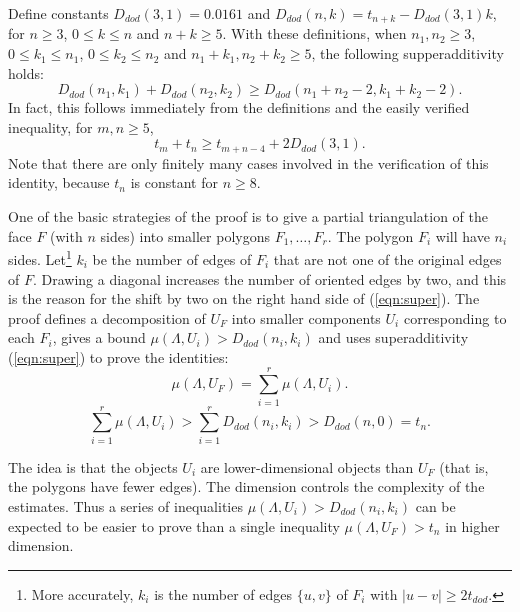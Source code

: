 Define constants $D_{dod}(3,1) = 0.0161$ and $D_{dod}(n,k) = t_{n+k} - D_{dod}(3,1)k$,
for $n\ge 3$, $0\le k\le n$ and $n+k\ge 5$.  With these definitions,
when $n_1,n_2\ge 3$, $0\le k_1\le n_1$, $0\le k_2\le n_2$ and $n_1+k_1,n_2+k_2\ge 5$,  the following supperadditivity holds:
\begin{equation}\label{eqn:super}
  D_{dod}(n_1,k_1) + D_{dod}(n_2,k_2) \ge D_{dod}(n_1+n_2-2,k_1+k_2-2).
\end{equation}
In fact, this follows immediately from the definitions and the
easily verified inequality,
for $m,n\ge 5$,
$$
t_m + t_n \ge t_{m+n-4} + 2 D_{dod}(3,1).
$$
Note that there are only finitely many cases involved in the
verification of this identity,
because $t_n$ is constant for $n\ge 8$.


One of the basic strategies of the proof is to give a partial triangulation
of the face $F$ (with $n$ sides)
into smaller polygons $F_1,\ldots,F_r$.   The polygon
$F_i$ will have $n_i$ sides.  Let\footnote{More accurately,
$k_i$ is the number of edges $\{u,v\}$ of $F_i$ with $|u-v|\ge 2t_{dod}$.} 
$k_i$ be the number of edges
of $F_i$ that are not one of the original edges of $F$. 
Drawing a diagonal increases the number of oriented edges by
two, and this is the reason for the shift by two on the right
hand side of (\ref{eqn:super}).   The proof defines
a decomposition of $U_F$ into smaller components $U_i$ corresponding
to each $F_i$, gives a bound $\mu(\Lambda,U_i) > D_{dod}(n_i,k_i)$
and uses superadditivity (\ref{eqn:super}) to prove the identities:
\begin{equation}\label{eqn:mu}
  \mu(\Lambda,U_F) = \sum_{i=1}^r \mu(\Lambda,U_i).
\end{equation}
\begin{equation}\label{eqn:super-mu}
\sum_{i=1}^r \mu(\Lambda,U_i) > \sum_{i=1}^r D_{dod}(n_i,k_i)
 > D_{dod}(n,0) = t_n.
\end{equation}

The idea is that the objects $U_i$ are lower-dimensional objects
than $U_F$ (that is, the polygons  have fewer edges).
The dimension controls the complexity
of the estimates.  Thus a series of inequalities $\mu(\Lambda,U_i) > D_{dod}(n_i,k_i)$
can be expected to be easier to prove than a single inequality
$\mu(\Lambda,U_F) > t_n$ in higher dimension.  

